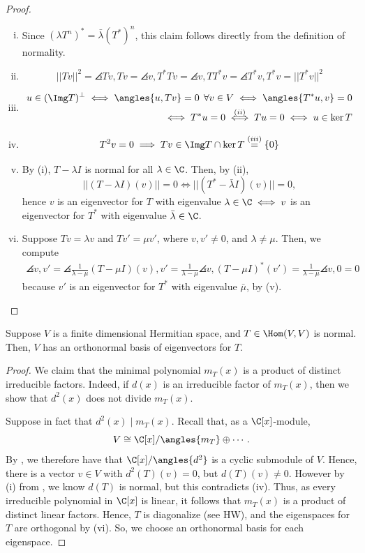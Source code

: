 \begin{proof}
    \hfill
    \begin{enumerate}[(i)]
        \item Since $(\lambda T^n)^* = \bar \lambda (T^*)^n$, this claim follows directly from the definition of normality.
        \item
        $$||Tv||^2 = \angles{Tv,Tv}=\angles{v,T^*Tv}= \angles{v,TT^*v}=\angles{T^*v,T^*v}=||T^*v||^2$$
        \item  \begin{align*}
            u \in (\Img T)^\perp \iff \angles{u, Tv}=0 \:\: \forall v\in V \iff \angles{T^*u,v}=0 \\ \iff T^*u=0 \overset{(ii)}{\iff} Tu=0 \iff u \in \ker T
        \end{align*}
        \item
        $$T^2v = 0 \implies Tv \in \Img T \cap \ker T \overset{(iii)}{=}\{0\}$$
        \item By (i), $T-\lambda I$ is normal for all $\lambda \in \C$. Then, by (ii),
        $$||(T-\lambda I)(v)|| = 0 \iff ||(T^*-\bar \lambda I)(v)||=0,$$
        hence $v$ is an eigenvector for $T$ with eigenvalue $\lambda \in \C \iff v$ is an eigenvector for $T^*$ with eigenvalue $\bar \lambda \in \C$.
        \item Suppose $Tv = \lambda v$ and $Tv' = \mu v'$, where $v,v' \neq 0$, and $\lambda \neq \mu$. Then, we compute
        \begin{align*}
            \angles{v,v'}=\angles{\frac{1}{\lambda - \mu}(T-\mu I)(v),v'}=\frac{1}{\lambda - \mu}\angles{v,(T-\mu I)^*(v')}=\frac{1}{\lambda - \mu}\angles{v,0}=0
        \end{align*}
        because $v'$ is an eigenvector for $T^*$ with eigenvalue $\bar \mu$, by (v).
    \end{enumerate}
\end{proof}

\begin{thm}
    Suppose $V$ is a finite dimensional Hermitian space, and $T\in \Hom(V,V)$ is normal. Then, $V$ has an orthonormal basis of eigenvectors for $T$.
\end{thm}

\begin{proof}
    We claim that the minimal polynomial $m_T(x)$ is a product of distinct irreducible factors. Indeed, if $d(x)$ is an irreducible factor of $m_T(x)$, then we show that $d^2(x)$ does not divide $m_T(x)$.

    Suppose in fact that $d^2(x) \mid m_T(x)$. Recall that, as a $\C[x]$-module,
    $$V \cong \C[x]/\angles{m_T} \oplus \cdots.$$
    By , we therefore have that $\C[x] / \angles{d^2}$ is a cyclic submodule of $V$. Hence, there is a vector $v \in V$ with $d^2(T)(v) =0 $, but $d(T)(v) \neq 0$. However by (i) from , we know $d(T)$ is normal, but this contradicts (iv). Thus, as every irreducible polynomial in $\C[x]$ is linear, it follows that $m_T(x)$ is a product of distinct linear factors. Hence, $T$ is diagonalize (see HW), and the eigenspaces for $T$ are orthogonal by (vi). So, we choose an orthonormal basis for each eigenspace.
\end{proof}

